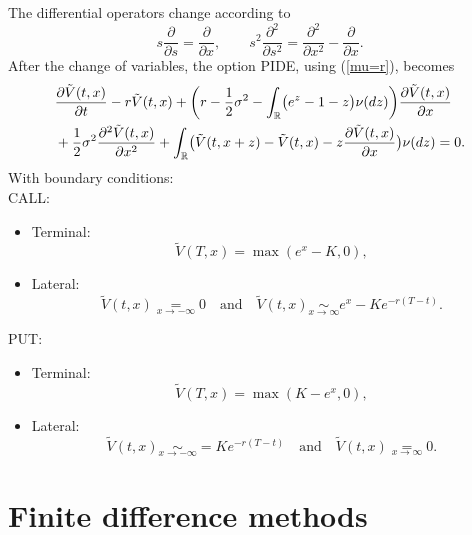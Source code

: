 The differential operators change according to
\begin{equation}\label{log_var}
s \frac{\partial}{\partial s} = \frac{\partial}{\partial x}, \hspace{2em} 
s^2 \frac{\partial^2}{\partial s^2} = \frac{\partial^2}{\partial x^2} - \frac{\partial}{\partial x} . 
\end{equation}
After the change of variables, the option PIDE, using (\ref{mu=r}), becomes 
\begin{align}\label{PIDE_log}
&  \frac{\partial \tilde V(t,x)}{\partial t} - r \tilde V(t,x) 
          + \biggl( r -\frac{1}{2}\sigma^2 - \int_{\mathbb{R}} \bigl( e^z-1-z \bigr) \nu(dz) \biggr) \frac{\partial \tilde V(t,x)}{\partial x} \\ \nonumber
          &+ \frac{1}{2} \sigma^2 \frac{\partial^2 \tilde V(t,x)}{\partial x^2} 
          + \int_{\mathbb{R}} \bigl( \tilde V(t,x+z)- \tilde V(t,x) - z \frac{\partial \tilde V(t,x)}{\partial x} \bigr) \nu(dz)  = 0.
\end{align}
With boundary conditions:\\
CALL:
\begin{itemize}
 \item Terminal:
 $$ \tilde V(T,x) = \max(e^x-K,0), $$
 \item Lateral:
 $$ \tilde V(t, x) \underset{x \to -\infty}{=} 0 \quad \mbox{and} \quad \tilde V(t, x) \underset{x \to \infty}{\sim} e^x - Ke^{-r(T-t)}. $$
\end{itemize}
PUT:
\begin{itemize}
 \item Terminal:
 $$ \tilde V(T,x) = \max(K-e^x,0), $$
 \item Lateral:
 $$ \tilde V(t, x) \underset{x \to -\infty}{\sim} = Ke^{-r(T-t)} \quad \mbox{and} \quad \tilde V(t, x) \underset{x \to \infty}{=} 0. $$
\end{itemize}


\section{Finite difference methods}\label{Finite_difference_methods}

